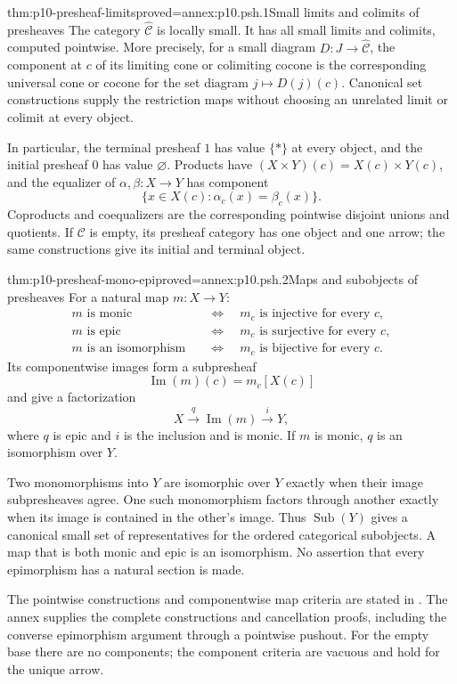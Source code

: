 \begin{hbtheorem}{thm:p10-presheaf-limits}{proved=annex:p10.psh.1}{Small limits and colimits of presheaves}
The category \(\widehat{\mathcal C}\) is locally small.
It has all small limits and colimits, computed pointwise.
More precisely, for a small diagram
\(D:J\to\widehat{\mathcal C}\), the component at \(c\) of
its limiting cone or colimiting cocone is the corresponding
universal cone or cocone for the set diagram \(j\mapsto D(j)(c)\).
Canonical set constructions supply the restriction maps without
choosing an unrelated limit or colimit at every object.

In particular, the terminal presheaf \(1\) has value \(\{*\}\)
at every object, and the initial presheaf \(0\) has value
\(\varnothing\).
Products have
\((X\times Y)(c)=X(c)\times Y(c)\), and the equalizer of
\(\alpha,\beta:X\to Y\) has component
\[
                         \{x\in X(c):\alpha_c(x)=\beta_c(x)\}.
\]
Coproducts and coequalizers are the corresponding pointwise
disjoint unions and quotients.
If \(\mathcal C\) is empty, its presheaf category has one object
and one arrow; the same constructions give its initial and
terminal object.
\end{hbtheorem}

\begin{hbtheorem}{thm:p10-presheaf-mono-epi}{proved=annex:p10.psh.2}{Maps and subobjects of presheaves}
For a natural map \(m:X\to Y\):
\[
 \begin{aligned}
 m\text{ is monic}
      &\quad\Longleftrightarrow\quad
                    m_c\text{ is injective for every }c,\\
 m\text{ is epic}
      &\quad\Longleftrightarrow\quad
                    m_c\text{ is surjective for every }c,\\
 m\text{ is an isomorphism}
      &\quad\Longleftrightarrow\quad
                    m_c\text{ is bijective for every }c.
 \end{aligned}
\]
Its componentwise images form a subpresheaf
\[
                    \operatorname{Im}(m)(c)=m_c[X(c)]
\]
and give a factorization
\[
                     X\xrightarrow{q}\operatorname{Im}(m)
                                      \xrightarrow{i}Y,
\]
where \(q\) is epic and \(i\) is the inclusion and is monic.
If \(m\) is monic, \(q\) is an isomorphism over \(Y\).

Two monomorphisms into \(Y\) are isomorphic over \(Y\) exactly
when their image subpresheaves agree.  One such monomorphism
factors through another exactly when its image is contained
in the other's image.
Thus \(\operatorname{Sub}(Y)\) gives a canonical small set of
representatives for the ordered categorical subobjects.
A map that is both monic and epic is an isomorphism.
No assertion that every epimorphism has a natural section is made.
\end{hbtheorem}

The pointwise constructions and componentwise map criteria are
stated in \cite[\S1, p.~3]{MoerdijkVanOosten2007Topos}.
The annex supplies the complete constructions and cancellation
proofs, including the converse epimorphism argument through a
pointwise pushout.
For the empty base there are no components; the component
criteria are vacuous and hold for the unique arrow.
